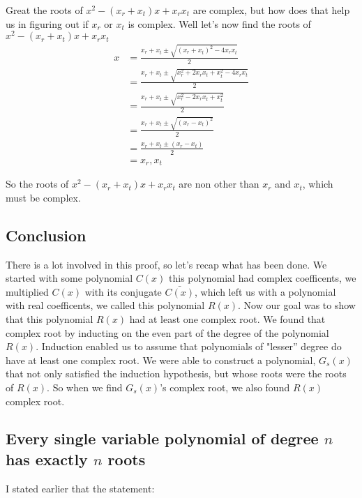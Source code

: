 \documentclass[12pt]{article}
\begin{document}
Great the roots of $x^2 - (x_r +x_t)x + x_r x_t$ are complex, but how does that help us in figuring out if $x_r$ or $x_t$ is complex.  Well let's now find the roots of $x^2 - (x_r +x_t)x + x_r x_t$
\begin{align*}
x &= \frac{x_r+x_t \pm \sqrt{(x_r+x_t)^2-4x_rx_t}}{2} \\
&= \frac{x_r+x_t \pm \sqrt{x_r^2 +2x_rx_t+x_t^2-4x_rx_t}}{2} \\
&= \frac{x_r+x_t \pm \sqrt{x_r^2 - 2 x_r x_t +x_t^2}}{2} \\
&= \frac{x_r +x_t \pm \sqrt{(x_r-x_t)^2}}{2} \\
&= \frac{x_r + x_t \pm (x_r-x_t)}{2} \\
&= x_r, x_t
\end{align*}

So the roots of $x^2 - (x_r +x_t)x + x_r x_t$ are non other than $x_r$ and $x_t$, which must be complex.

\subsection*{Conclusion}

There is a lot involved in this proof, so let's recap what has been done.  We started with some polynomial $C(x)$ this polynomial had complex coefficents, we multiplied $C(x)$ with its conjugate $\bar{C(x)}$, which left us with a polynomial with real coefficents, we called this polynomial $R(x)$.  Now our goal was to show that this polynomial $R(x)$ had at least one complex root.  We found that complex root by inducting on the even part of the degree of the polynomial $R(x)$.  Induction enabled us to assume that polynomials of "lesser'' degree do have at least one complex root.  We were able to construct a polynomial, $G_s(x)$ that not only satisfied the induction hypothesis, but whose roots were the roots of $R(x)$.  So when we find $G_s(x)$'s complex root, we also found $R(x)$ complex root.


\subsection*{Every single variable polynomial of degree $n$ has exactly $n$ roots}
I stated earlier that the statement:

\end{document}
